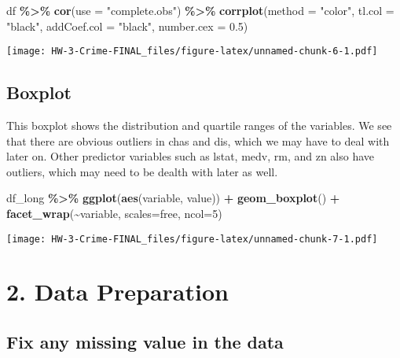 \documentclass[
]{article}
\newenvironment{Shaded}{\begin{snugshade}}{\end{snugshade}}
\newcommand{\AttributeTok}[1]{\textcolor[rgb]{0.13,0.29,0.53}{#1}}
\newcommand{\DecValTok}[1]{\textcolor[rgb]{0.00,0.00,0.81}{#1}}
\newcommand{\FloatTok}[1]{\textcolor[rgb]{0.00,0.00,0.81}{#1}}
\newcommand{\FunctionTok}[1]{\textcolor[rgb]{0.13,0.29,0.53}{\textbf{#1}}}
\newcommand{\NormalTok}[1]{#1}
\newcommand{\SpecialCharTok}[1]{\textcolor[rgb]{0.81,0.36,0.00}{\textbf{#1}}}
\newcommand{\StringTok}[1]{\textcolor[rgb]{0.31,0.60,0.02}{#1}}
\begin{document}
\begin{Shaded}
\begin{Highlighting}[]
\NormalTok{df }\SpecialCharTok{\%\textgreater{}\%} 
  \FunctionTok{cor}\NormalTok{(}\AttributeTok{use =} \StringTok{"complete.obs"}\NormalTok{) }\SpecialCharTok{\%\textgreater{}\%}
  \FunctionTok{corrplot}\NormalTok{(}\AttributeTok{method =} \StringTok{"color"}\NormalTok{, }\AttributeTok{tl.col =} \StringTok{"black"}\NormalTok{, }\AttributeTok{addCoef.col =} \StringTok{"black"}\NormalTok{, }\AttributeTok{number.cex =} \FloatTok{0.5}\NormalTok{)}
\end{Highlighting}
\end{Shaded}

\texttt{[image: HW-3-Crime-FINAL\_files/figure-latex/unnamed-chunk-6-1.pdf]}

\hypertarget{boxplot}{%
\subsection{Boxplot}\label{boxplot}}

This boxplot shows the distribution and quartile ranges of the
variables. We see that there are obvious outliers in chas and dis, which
we may have to deal with later on. Other predictor variables such as
lstat, medv, rm, and zn also have outliers, which may need to be dealth
with later as well.

\begin{Shaded}
\begin{Highlighting}[]
\NormalTok{df\_long }\SpecialCharTok{\%\textgreater{}\%} 
  \FunctionTok{ggplot}\NormalTok{(}\FunctionTok{aes}\NormalTok{(variable, value)) }\SpecialCharTok{+} 
  \FunctionTok{geom\_boxplot}\NormalTok{() }\SpecialCharTok{+} 
  \FunctionTok{facet\_wrap}\NormalTok{(}\SpecialCharTok{\textasciitilde{}}\NormalTok{variable, }\AttributeTok{scales=}\StringTok{\textquotesingle{}free\textquotesingle{}}\NormalTok{, }\AttributeTok{ncol=}\DecValTok{5}\NormalTok{)}
\end{Highlighting}
\end{Shaded}

\texttt{[image: HW-3-Crime-FINAL\_files/figure-latex/unnamed-chunk-7-1.pdf]}

\hypertarget{data-preparation}{%
\section{2. Data Preparation}\label{data-preparation}}

\hypertarget{fix-any-missing-value-in-the-data}{%
\subsection{Fix any missing value in the
data}\label{fix-any-missing-value-in-the-data}}
\end{document}
